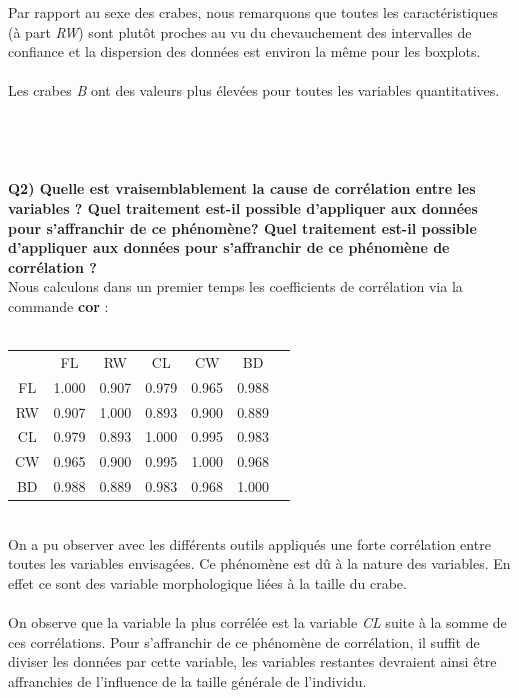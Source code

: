 \documentclass[a4paper, 8pt]{article}
\begin{document}
Par rapport au sexe des crabes, nous remarquons que toutes les caract\'eristiques (\`a part \textit{RW}) sont plut\^ot proches au vu
du chevauchement des intervalles de confiance et la dispersion des donn\'ees est environ la m\^eme pour les boxplots.\\ \\
Les crabes \textit{B} ont des valeurs plus \'elev\'ees pour toutes les variables quantitatives.\\ \\ \\ \\ \\
\textbf{Q2) Quelle est vraisemblablement la cause de corrélation entre les variables ? Quel traitement est-il possible d’appliquer aux données pour
s’affranchir de ce phénomène? Quel traitement est-il possible d'appliquer aux donn\'ees pour s'affranchir de ce ph\'enom\`ene de corr\'elation ?}\\
Nous calculons dans un premier temps les coefficients de corrélation via la commande \textbf{cor} :\\ \\
\begin{tabular}{|c|c|c|c|c|c|c|}
\hline
 & FL & RW & CL & CW & BD\\
FL & 1.000 & 0.907 & 0.979 & 0.965 & 0.988\\
\hline
RW & 0.907 & 1.000 & 0.893 & 0.900 & 0.889\\
\hline
CL & 0.979 & 0.893 & 1.000 & 0.995 & 0.983\\
\hline
CW & 0.965 & 0.900 & 0.995 & 1.000 & 0.968\\
\hline
BD & 0.988 & 0.889 & 0.983 & 0.968 & 1.000\\
\hline
\end{tabular}\\


On a pu observer avec les différents outils appliqués une forte corrélation entre toutes les variables envisagées. Ce phénomène est dû à la nature des variables. En effet ce sont des variable morphologique liées à la taille du crabe.\\ \\


On observe que la variable la plus corr\'el\'ee est la variable \textit{CL} suite à la somme de ces corr\'elations.
Pour s'affranchir de ce ph\'enom\`ene de corr\'elation, il suffit de diviser les donn\'ees par cette variable, les variables restantes devraient ainsi être affranchies de l’influence de la taille générale de l’individu.
\end{document}
